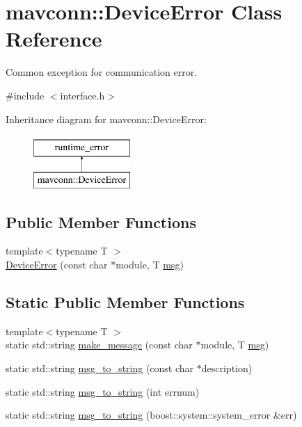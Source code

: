 \hypertarget{classmavconn_1_1DeviceError}{}\section{mavconn\+::Device\+Error Class Reference}
\label{classmavconn_1_1DeviceError}


Common exception for communication error.  




{\ttfamily \#include $<$interface.\+h$>$}

Inheritance diagram for mavconn\+::Device\+Error\+:\begin{figure}[H]
\begin{center}
\leavevmode
\includegraphics[height=2.000000cm]{classmavconn_1_1DeviceError}
\end{center}
\end{figure}
\subsection*{Public Member Functions}
\begin{DoxyCompactItemize}
\item 
{\footnotesize template$<$typename T $>$ }\\\mbox{\hyperlink{group__mavconn_ga686d0d40b10a4d013dc09de32a43efaa}{Device\+Error}} (const char $\ast$module, T \mbox{\hyperlink{stratnode_8cpp_a82cfe4ed9bc9e1b07c8bf209c324d85b}{msg}})
\end{DoxyCompactItemize}
\subsection*{Static Public Member Functions}
\begin{DoxyCompactItemize}
\item 
{\footnotesize template$<$typename T $>$ }\\static std\+::string \mbox{\hyperlink{group__mavconn_ga76a9378a9bfc4f2b6f1b9c3ecb00ec9a}{make\+\_\+message}} (const char $\ast$module, T \mbox{\hyperlink{stratnode_8cpp_a82cfe4ed9bc9e1b07c8bf209c324d85b}{msg}})
\item 
static std\+::string \mbox{\hyperlink{group__mavconn_gae998ec92e731b23abc43286b88fa84ca}{msg\+\_\+to\+\_\+string}} (const char $\ast$description)
\item 
static std\+::string \mbox{\hyperlink{group__mavconn_ga0422d27d75fd22d67cc678d9b92f9d95}{msg\+\_\+to\+\_\+string}} (int errnum)
\item 
static std\+::string \mbox{\hyperlink{group__mavconn_ga1a6103f0af6a0a451ae5af0ba190a50d}{msg\+\_\+to\+\_\+string}} (boost\+::system\+::system\+\_\+error \&err)
\end{DoxyCompactItemize}


